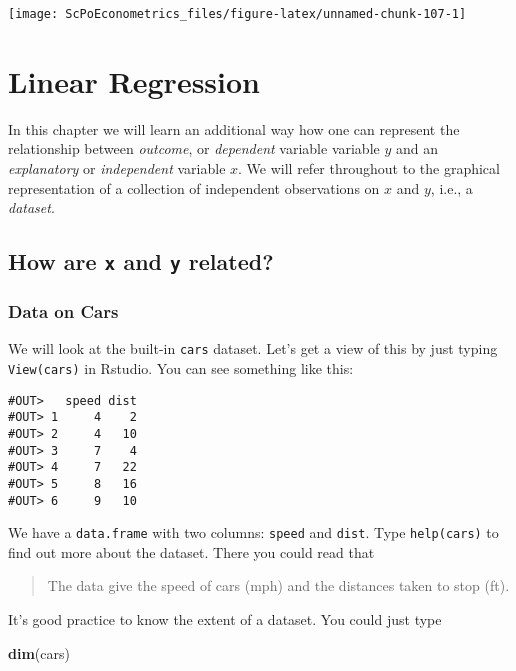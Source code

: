 \documentclass[]{book}
\newenvironment{Shaded}{\begin{snugshade}}{\end{snugshade}}
\newcommand{\KeywordTok}[1]{\textcolor[rgb]{0.13,0.29,0.53}{\textbf{#1}}}
\newcommand{\NormalTok}[1]{#1}
\begin{document}
\begin{center}\texttt{[image: ScPoEconometrics\_files/figure-latex/unnamed-chunk-107-1]} \end{center}

\hypertarget{linreg}{%
\chapter{Linear Regression}\label{linreg}}

In this chapter we will learn an additional way how one can represent the relationship between \emph{outcome}, or \emph{dependent} variable variable \(y\) and an \emph{explanatory} or \emph{independent} variable \(x\). We will refer throughout to the graphical representation of a collection of independent observations on \(x\) and \(y\), i.e., a \emph{dataset}.

\hypertarget{how-are-x-and-y-related}{%
\section{\texorpdfstring{How are \texttt{x} and \texttt{y} related?}{How are x and y related?}}\label{how-are-x-and-y-related}}

\hypertarget{data-on-cars}{%
\subsection{Data on Cars}\label{data-on-cars}}

We will look at the built-in \texttt{cars} dataset. Let's get a view of this by just typing \texttt{View(cars)} in Rstudio. You can see something like this:

\begin{verbatim}
#OUT>   speed dist
#OUT> 1     4    2
#OUT> 2     4   10
#OUT> 3     7    4
#OUT> 4     7   22
#OUT> 5     8   16
#OUT> 6     9   10
\end{verbatim}

We have a \texttt{data.frame} with two columns: \texttt{speed} and \texttt{dist}. Type \texttt{help(cars)} to find out more about the dataset. There you could read that

\begin{quote}
The data give the speed of cars (mph) and the distances taken to stop (ft).
\end{quote}

It's good practice to know the extent of a dataset. You could just type

\begin{Shaded}
\begin{Highlighting}[]
\KeywordTok{dim}\NormalTok{(cars)}
\end{Highlighting}
\end{Shaded}
\end{document}
